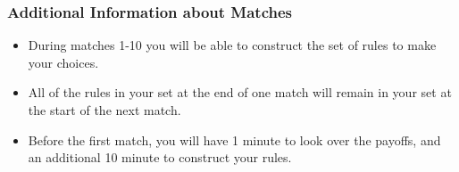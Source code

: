 \documentclass[11pt]{article}
\newcommand{\dblbkt}[1]{}
\begin{document}
\subsubsection*{\dblbkt{3}Additional Information about Matches}
\begin{itemize} 
\item During matches 1-10 you will be able to construct the set of rules to make your choices.
\item \dblbkt{1}All of the rules in your set at the end of one match will remain in your set at the start of the next match.  
\item \dblbkt{1}Before the first match, \dblbkt{1}you will have 1 minute to look over the payoffs, \dblbkt{1}and an additional 10 minute to construct your rules.
\end{itemize} 
\end{document}
